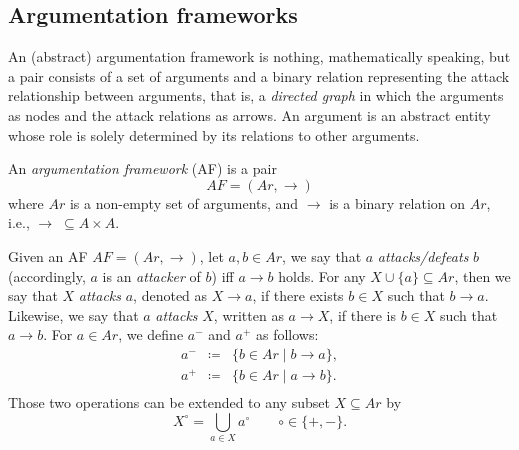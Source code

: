 










\subsection{Argumentation frameworks}
\label{subsec: AFs}


An (abstract) argumentation framework is nothing, 
mathematically speaking, 
but a pair consists of a set of arguments and a binary relation representing the attack relationship between arguments, 
that is, 
a \textit{directed graph} in which the arguments as nodes and the attack relations as arrows. 
% 
An argument is an abstract entity whose role is solely determined by its relations to other arguments.



\begin{df}
    An \textit{argumentation framework} (AF) is a pair 
    \[
        AF = (Ar,\to)
    \]
    where $Ar$ is a non-empty set of arguments, 
    and $\to$ is a binary relation on $Ar$, 
    i.e.,
    $\to\; \subseteq A \times A$.
\end{df}



Given an AF $AF=(Ar,\to)$, 
let $a,b \in Ar$, 
we say that $a$ \textit{attacks/defeats} $b$ (accordingly, $a$ is an \textit{attacker} of $b$) iff $a \to b$ holds.
% 
For any $X \cup \{a\} \subseteq Ar$, 
then we say that $X$ \textit{attacks} $a$, 
denoted as $X \to a$, 
if there exists $b \in X$ such that $b \to a$.
% 
Likewise, 
we say that $a$ \textit{attacks} $X$, 
written as $a \to X$, 
if there is $b \in X$ such that $a \to b$.
% 
% 
For $a \in Ar$, 
we define $a^-$ and $a^+$ as follows:
\[
\begin{array}{rll}
    a^- &\coloneqq& \{b \in Ar \mid b \to a\},  \\
    
    a^+ &\coloneqq& \{b \in Ar \mid a \to b\}.  \\
\end{array}
\]
Those two operations can be extended to any subset $X \subseteq Ar$ by
\[
    X^\circ   = \bigcup_{a \in X} a^\circ 
    \qquad
    \circ \in\{+,-\}.
\]





